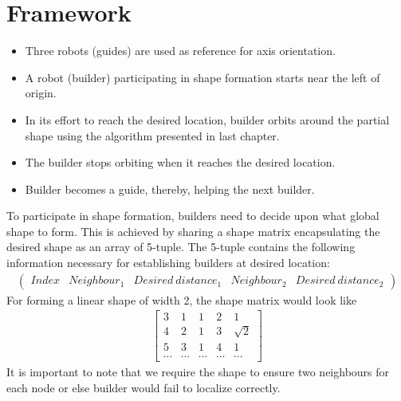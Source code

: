 \documentclass{report}[12pt]
\begin{document}
\section{Framework}
\begin{itemize}
        \item Three robots (guides) are used as reference for axis orientation.
        \item A robot (builder) participating in shape formation starts near the left of origin.
        \item In its effort to reach the desired location, builder orbits around the partial shape using the algorithm presented in last chapter.
        \item The builder stops orbiting when it reaches the desired location.
        \item Builder becomes a guide, thereby, helping the next builder.
\end{itemize}
To participate in shape formation, builders need to decide upon what global shape to form. This is achieved by sharing a shape matrix encapsulating the desired shape as an array of 5-tuple. The 5-tuple contains the following information necessary for establishing builders at desired location:
\begin{align}
\left(
\begin{matrix}
    Index & Neighbour_1 & Desired\ distance_1 & Neighbour_2 & Desired\ distance_2
\end{matrix}
\right)
\end{align}
For forming a linear shape of width 2, the shape matrix would look like
\begin{align}
\label{eq:shape_matrix_linear}
\begin{bmatrix}
    3 & 1 & 1 & 2 & 1\\
    4 & 2 & 1 & 3 & \sqrt{2}\\
    5 & 3 & 1 & 4 & 1\\
    \cdots & \cdots & \cdots & \cdots & \cdots
\end{bmatrix}
\end{align}
It is important to note that we require the shape to ensure two neighbours for each node or else builder would fail to localize correctly.
\end{document}
